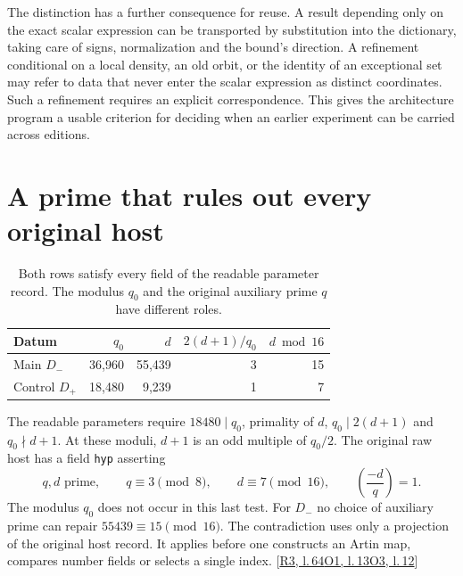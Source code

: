 \documentclass[12pt,letterpaper]{article}
\newcommand{\id}[1]{{\small\nolinkurl{#1}}}
\begin{document}
The distinction has a further consequence for reuse. A result depending only on the exact scalar expression can be transported by substitution into the dictionary, taking care of signs, normalization and the bound's direction. A refinement conditional on a local density, an old orbit, or the identity of an exceptional set may refer to data that never enter the scalar expression as distinct coordinates. Such a refinement requires an explicit correspondence. This gives the architecture program a usable criterion for deciding when an earlier experiment can be carried across editions.

\section{A prime that rules out every original host}
\begin{table}[ht]\centering\small
\begin{tabular}{@{}lrrrr@{}}\toprule
Datum & $q_0$ & $d$ & $2(d+1)/q_0$ & $d\bmod 16$\\\midrule
Main $D_-$ & 36,960 & 55,439 & 3 & 15\\
Control $D_+$ & 18,480 & 9,239 & 1 & 7\\\bottomrule
\end{tabular}\caption{Both rows satisfy every field of the readable parameter record. The modulus $q_0$ and the original auxiliary prime $q$ have different roles.}\label{tab:p}
\end{table}

The readable parameters require $18480\mid q_0$, primality of $d$, $q_0\mid 2(d+1)$ and $q_0\nmid d+1$. At these moduli, $d+1$ is an odd multiple of $q_0/2$. The original raw host has a field \id{hyp} asserting
\[
 q,d\text{ prime},\qquad q\equiv3\pmod8,\qquad
 d\equiv7\pmod{16},\qquad \left(\frac{-d}{q}\right)=1 .
\]
The modulus $q_0$ does not occur in this last test. For $D_-$ no choice of auxiliary prime can repair $55439\equiv15\pmod{16}$. The contradiction uses only a projection of the original host record. It applies before one constructs an Artin map, compares number fields or selects a single index. {\footnotesize\sffamily\color{mute}[\href{https://github.com/leanprover-community/riemann-hypothesis/blob/e063a923620ee7787b4a1270421478645bf66bdb/src/New/Reduction/Data/FieldsAndPlaces.lean\#L64}{R3, l.\,64}\enspace \href{https://github.com/nousentllc/riemann-hypothesis/blob/40e56bab026552e089d7afcfeff08d2defb9c005/src/Formalism/FrobeniusOrbits/Statement.lean\#L13}{O1, l.\,13}\enspace \href{https://github.com/nousentllc/riemann-hypothesis/blob/40e56bab026552e089d7afcfeff08d2defb9c005/src/Formalism/SharpRestriction/RamificationFrobenius/TotientGaloisClasses/ConjEMemHostFIff.lean\#L12}{O3, l.\,12}]}
\end{document}
